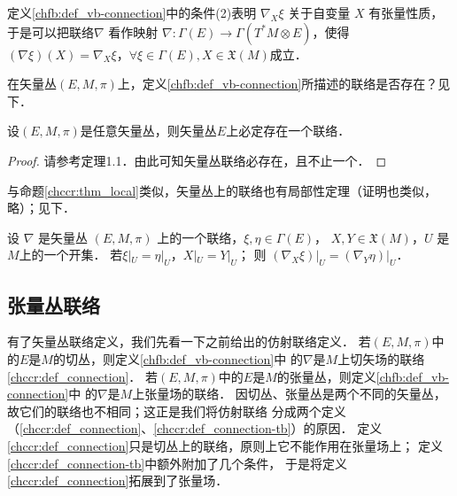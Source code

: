 定义\ref{chfb:def_vb-connection}中的条件(2)表明 $\nabla_X \xi$ 关于自变量 $X$ 有张量性质，
于是可以把联络$\nabla$ 看作映射 $\nabla: \Gamma(E) \rightarrow \Gamma (T^* M \otimes E )$，使得
$(\nabla \xi)(X)=\nabla_X \xi$，$ \forall \xi \in \Gamma(E), X \in \mathfrak{X}(M) $成立．


在矢量丛$(E,M,\pi)$上，定义\ref{chfb:def_vb-connection}所描述的联络是否存在？见下．

\begin{theorem}\label{chfb:thm_existence}
    设$(E,M,\pi)$是任意矢量丛，则矢量丛$E$上必定存在一个联络．
\end{theorem}
\begin{proof}
    请参考\parencite[p.104]{cc2001-zh}定理1.1．由此可知矢量丛联络必存在，且不止一个．
\end{proof}

与命题\ref{chccr:thm_local}类似，矢量丛上的联络也有局部性定理（证明也类似，略）；见下．
\begin{proposition}
    设 $\nabla$ 是矢量丛 $(E,M,\pi)$ 上的一个联络，$\xi, \eta \in \Gamma(E)$，
    $ X, Y \in \mathfrak{X}(M)$，$U$ 是 $M$上的一个开集． 
    若$ \xi|_U = \eta|_U$，$ X|_U = Y|_U $；
    则 $\left.\left(\nabla_X \xi\right)\right|_U=\left.\left(\nabla_Y \eta\right)\right|_U$．
\end{proposition}

\subsection{张量丛联络}

有了矢量丛联络定义，我们先看一下之前给出的仿射联络定义．
若$(E,M,\pi)$中的$E$是$M$的切丛，则定义\ref{chfb:def_vb-connection}中
的$\nabla$是$M$上切矢场的联络\ref{chccr:def_connection}．
若$(E,M,\pi)$中的$E$是$M$的张量丛，则定义\ref{chfb:def_vb-connection}中
的$\nabla$是$M$上张量场的联络．
因切丛、张量丛是两个不同的矢量丛，故它们的联络也不相同；这正是我们将仿射联络
分成两个定义（\ref{chccr:def_connection}、\ref{chccr:def_connection-tb}）的原因．
定义\ref{chccr:def_connection}只是切丛上的联络，原则上它不能作用在张量场上；
定义\ref{chccr:def_connection-tb}中额外附加了几个条件，
于是将定义\ref{chccr:def_connection}拓展到了张量场．



